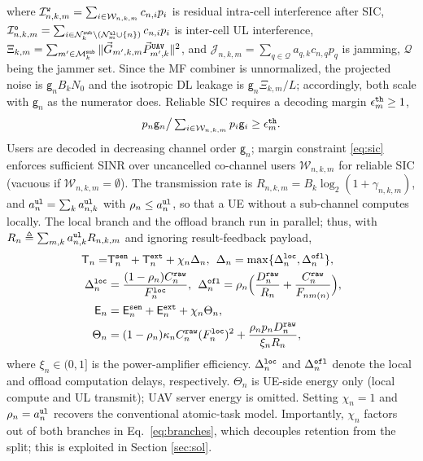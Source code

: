 \documentclass[journal]{IEEEtran}
\begin{document}
where $\mathcal{I}_{n,k,m}^{\tt w}=\sum_{i\in\mathcal{W}_{n,k,m}}c_{n,i} p_i$ is residual intra-cell interference after SIC,
$\mathcal{I}_{n,k,m}^{\tt o}=\sum_{i\in\mathcal{N}_k^{\tt sub}\setminus(\mathcal{N}_m^{\tt ul}\cup\{n\})}c_{n,i} p_i$ is inter-cell UL interference,
$\Xi_{k,m}=\sum_{m'\in\mathcal{M}_k^{\tt sub}}\Vert\vec{G}_{m',k,m}\vec{P}_{m',k}^{\tt UAV}\Vert^2$, and
$\mathcal{J}_{n,k,m}=\sum_{q\in\mathcal{Q}}a_{q,k}c_{n,q} p_q$ is jamming, $\mathcal{Q}$ being the jammer set. 
Since the MF combiner is unnormalized, the projected noise is $\mathsf{g}_nB_kN_0$ and the isotropic DL leakage is $\mathsf{g}_n\Xi_{k,m}/L$; accordingly, both scale with $\mathsf{g}_n$ as the numerator does.
Reliable SIC requires a decoding margin $\epsilon_m^{\tt th}\ge1$,
\begin{equation}
\textstyle p_n\mathsf{g}_n\big/\sum_{i\in\mathcal{W}_{n,k,m}}p_i\mathsf{g}_i\ge\epsilon_m^{\tt th}.
\label{eq:sic}
\end{equation}
{\color{blue}Users are decoded in decreasing channel order $\mathsf{g}_n$; margin constraint \eqref{eq:sic} enforces sufficient SINR over uncancelled co-channel users $\mathcal{W}_{n,k,m}$ for reliable SIC (vacuous if $\mathcal{W}_{n,k,m}=\emptyset$).}
The transmission rate is $R_{n,k,m}=B_k\log_2(1+\gamma_{n,k,m})$, and $a_n^{\tt ul}=\sum_k a_{n,k}^{\tt ul}$ with $\rho_n\le a_n^{\tt ul}$, so that a UE without a sub-channel computes locally. The local branch and the offload branch run in parallel; thus, with $R_n\triangleq\sum_{m,k}a_{n,k}^{\tt ul}R_{n,k,m}$ and ignoring result-feedback payload,
\begin{align}
\mathsf{T}_n=&\mathsf{T}_n^{\tt sen}+\mathsf{T}_n^{\tt ext}+\chi_n\Delta_n,
\hspace{1ex}
\Delta_n=\max\{\Delta_n^{\tt loc},\Delta_n^{\tt ofl}\},
\label{eq:Tn}\\
\Delta_n^{\tt loc}&=\frac{(1-\rho_n)C_n^{\tt raw}}{F_n^{\tt loc}}, \hspace{1ex}
\Delta_n^{\tt ofl}=\rho_n\Big(\frac{D_n^{\tt raw}}{R_n}+\frac{C_n^{\tt raw}}{F_{n m(n)}}\Big),
\label{eq:branches}\\
\mathsf{E}_n&=\mathsf{E}_n^{\tt sen}+\mathsf{E}_n^{\tt ext}+\chi_n\Theta_n,
\label{eq:En}\\
\Theta_n&=(1-\rho_n)\kappa_n C_n^{\tt raw}(F_n^{\tt loc})^2+\frac{\rho_n p_n D_n^{\tt raw}}{\xi_n R_n},
\label{eq:Theta}
\end{align}
where $\xi_n\in(0,1]$ is the power-amplifier efficiency.
{$\Delta_n^{\tt loc}$ and $\Delta_n^{\tt ofl}$ denote the local and offload computation delays, respectively.}
$\Theta_n$ is UE-side energy only (local compute and UL transmit); UAV server energy is omitted.
Setting $\chi_n=1$ and $\rho_n=a_n^{\tt ul}$ recovers the conventional atomic-task model. 
Importantly, $\chi_n$ factors out of both branches in Eq.~\eqref{eq:branches}, which decouples retention from the split; this is exploited in Section \ref{sec:sol}.
\end{document}
